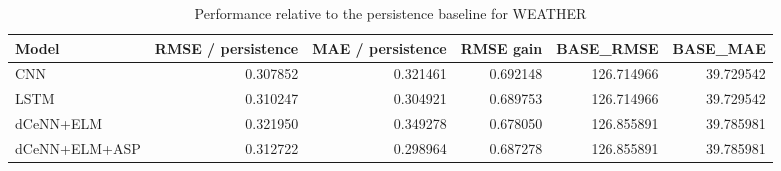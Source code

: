 \begin{table}
\caption{Performance relative to the persistence baseline for WEATHER}
\begin{tabular}{lrrrrr}
\toprule
Model & RMSE / persistence & MAE / persistence & RMSE gain & BASE\_RMSE & BASE\_MAE \\
\midrule
CNN & 0.307852 & 0.321461 & 0.692148 & 126.714966 & 39.729542 \\
LSTM & 0.310247 & 0.304921 & 0.689753 & 126.714966 & 39.729542 \\
dCeNN+ELM & 0.321950 & 0.349278 & 0.678050 & 126.855891 & 39.785981 \\
dCeNN+ELM+ASP & 0.312722 & 0.298964 & 0.687278 & 126.855891 & 39.785981 \\
\bottomrule
\end{tabular}
\end{table}
